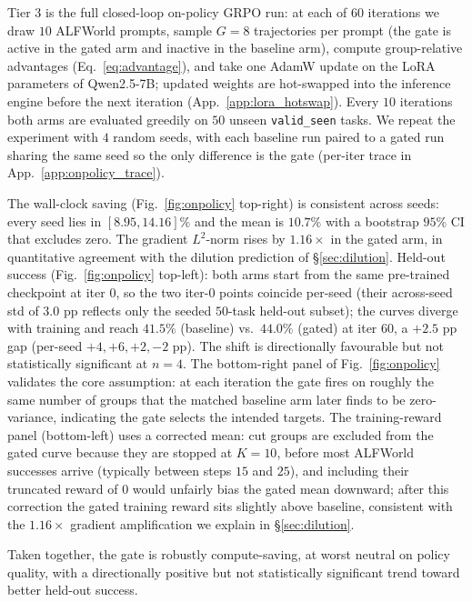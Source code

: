 \documentclass{article}
\begin{document}
Tier 3 is the full closed-loop on-policy GRPO run: at each of
$60$ iterations we draw $10$ ALFWorld prompts, sample $G\!=\!8$
trajectories per prompt (the gate is active in the gated arm and
inactive in the baseline arm), compute group-relative advantages
(Eq.~\ref{eq:advantage}), and take one AdamW update on the LoRA
parameters of Qwen2.5-7B; updated weights are hot-swapped into
the inference engine before the next iteration
(App.~\ref{app:lora_hotswap}). Every $10$ iterations both arms
are evaluated greedily on $50$ unseen \texttt{valid\_seen} tasks.
We repeat the experiment with $4$ random seeds, with each
baseline run paired to a gated run sharing the same seed so the
only difference is the gate (per-iter trace in
App.~\ref{app:onpolicy_trace}).

The wall-clock saving (Fig.~\ref{fig:onpolicy} top-right) is
consistent across seeds: every seed lies in $[8.95, 14.16]\%$
and the mean is $\mathbf{10.7\%}$ with a bootstrap $95\%$ CI
that excludes zero. The gradient $L^2$-norm rises by
$1.16\!\times$ in the gated arm, in quantitative agreement with
the dilution prediction of \S\ref{sec:dilution}. Held-out success
(Fig.~\ref{fig:onpolicy} top-left): both arms start from the
same pre-trained checkpoint at iter $0$, so the two iter-$0$
points coincide per-seed (their across-seed std of $3.0$ pp
reflects only the seeded $50$-task held-out subset); the curves
diverge with training and reach $41.5\%$ (baseline) vs.\
$\mathbf{44.0\%}$ (gated) at iter $60$, a $+2.5$ pp gap
(per-seed $+4, +6, +2, -2$ pp). The shift is directionally
favourable but not statistically significant at $n\!=\!4$.
The bottom-right panel of Fig.~\ref{fig:onpolicy} validates the
core assumption: at each iteration the gate fires on roughly the
same number of groups that the matched baseline arm later finds
to be zero-variance, indicating the gate selects the intended
targets. The training-reward panel (bottom-left) uses a
corrected mean: cut groups are excluded from the gated curve
because they are stopped at $K\!=\!10$, before most ALFWorld
successes arrive (typically between steps $15$ and $25$), and
including their truncated reward of $0$ would unfairly bias the
gated mean downward; after this correction the gated training
reward sits slightly above baseline, consistent with the
$1.16\!\times$ gradient amplification we explain in
\S\ref{sec:dilution}.

Taken together, the gate is robustly compute-saving, at worst
neutral on policy quality, with a directionally positive but
not statistically significant trend toward better held-out
success.
\end{document}
